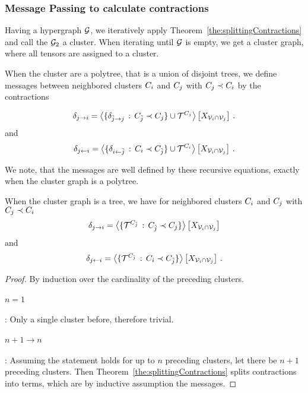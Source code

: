 \subsubsection{Message Passing to calculate contractions}

Having a hypergraph $\graph$, we iteratively apply Theorem~\ref{the:splittingContractions} and call the $\graph_2$ a cluster.
When iterating until $\graph$ is empty, we get a cluster graph, where all tensors are assigned to a cluster.


When the cluster are a polytree, that is a union of disjoint trees, we define messages between neighbored clusters $\enc$ and $\secenc$ with $\secenc\prec\enc$ by the contractions

\begin{align}
	\upmes{j}{i} = \contractionof{\{\upmes{\tilde{j}}{j} \, : \,  \thirdenc \prec \secenc\} \cup \tnetof{\secenc}}{\catvariableof{\nodes_i\cap \nodes_j}} \, .
\end{align}
and
\begin{align}
	\downmes{i}{j}  = \contractionof{\{\downmes{\tilde{j}}{i} \, : \,  \enc \prec  \thirdenc\} \cup \tnetof{\enc}}{\catvariableof{\nodes_i\cap \nodes_j}} \, .
\end{align}


We note, that the messages are well defined by these recursive equations, exactly when the cluster graph is a polytree.


\begin{lemma}
	When the cluster graph is a tree, we have for neighbored clusters $\enc$ and $\secenc$ with $\secenc\prec\enc$
		\[ \upmes{\secclusterenumerator}{\clusterenumerator} 
		= \contractionof{\{\tnetof{\thirdenc} \, : \, \thirdenc \prec \secenc \}}{\catvariableof{\nodes_i\cap\nodes_j}}   \]
	and
		\[ \downmes{\clusterenumerator}{\secclusterenumerator}
		= \contractionof{\{\tnetof{\thirdenc} \, : \, \enc \prec \thirdenc \}}{\catvariableof{\nodes_i\cap\nodes_j}}  \, . \]
\end{lemma}
\begin{proof}
	By induction over the cardinality of the preceding clusters.
	\paragraph{$n=1$}: Only a single cluster before, therefore trivial.
	\paragraph{$n+1\rightarrow n$}: Assuming the statement holds for up to $n$ preceding clusters, let there be $n+1$ preceding clusters.
	Then Theorem~\ref{the:splittingContractions} splits contractions into terms, which are by inductive assumption the messages.
\end{proof}



